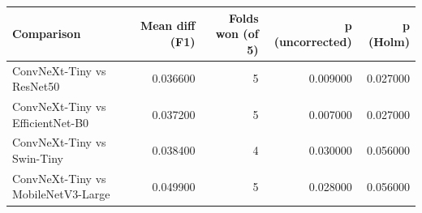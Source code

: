 \begin{tabular}{lrrrr}
\toprule
Comparison & Mean diff (F1) & Folds won (of 5) & p (uncorrected) & p (Holm) \\
\midrule
ConvNeXt-Tiny vs ResNet50 & 0.036600 & 5 & 0.009000 & 0.027000 \\
ConvNeXt-Tiny vs EfficientNet-B0 & 0.037200 & 5 & 0.007000 & 0.027000 \\
ConvNeXt-Tiny vs Swin-Tiny & 0.038400 & 4 & 0.030000 & 0.056000 \\
ConvNeXt-Tiny vs MobileNetV3-Large & 0.049900 & 5 & 0.028000 & 0.056000 \\
\bottomrule
\end{tabular}
